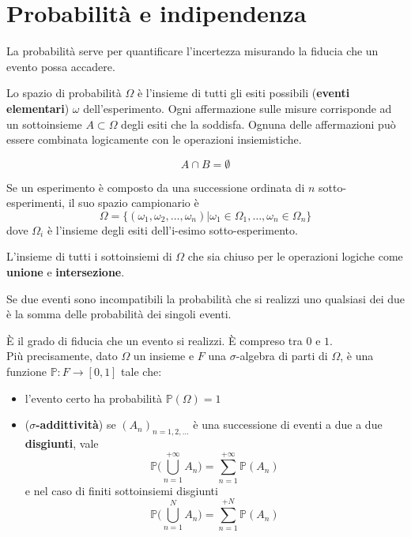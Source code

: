 \newpage
\section{Probabilità e indipendenza}
La probabilità serve per quantificare l'incertezza misurando la fiducia che un evento possa accadere.
\begin{definition}
	Lo spazio di probabilità $\Omega$ è l'insieme di tutti gli esiti possibili (\textbf{eventi elementari}) $\omega$ dell'esperimento. Ogni affermazione sulle misure corrisponde ad un sottoinsieme $A \subset \Omega$ degli esiti che la soddisfa. Ognuna delle affermazioni può essere combinata logicamente con le operazioni insiemistiche.
\end{definition}
\begin{definition}
	\begin{equation}
		A \cap B = \emptyset
	\end{equation}
\end{definition}
\begin{definition}
	Se un esperimento è composto da una successione ordinata di $n$ sotto-esperimenti, il suo spazio campionario è
	\begin{equation}
		\Omega = \{(\omega_1, \omega_2, \ldots, \omega_n) \vert \omega_1 \in \Omega_1, \ldots, \omega_n \in \Omega_n\}
	\end{equation}
	dove $\Omega_i$ è l'insieme degli esiti dell'i-esimo sotto-esperimento.
\end{definition}
\begin{definition}
	L'insieme di tutti i sottoinsiemi di $\Omega$ che sia chiuso per le operazioni logiche come \textbf{unione} e \textbf{intersezione}.
\end{definition}
\begin{observation}
	Se due eventi sono incompatibili la probabilità che si realizzi uno qualsiasi dei due è la somma delle probabilità dei singoli eventi.
\end{observation}
\begin{definition}[Probabilità]
	È il grado di fiducia che un evento si realizzi. È compreso tra $0$ e $1$.\\
	Più precisamente, dato $\Omega$ un insieme e $F$ una $\sigma$-algebra di parti di $\Omega$, è una funzione $\mathbb{P}:F\to [0,1]$ tale che:
	\begin{itemize}
		\item l'evento certo ha probabilità $\mathbb{P}(\Omega)=1$
		\item (\textbf{$\sigma$-addittività}) se $(A_n)_{n=1,2,\ldots}$ è una successione di eventi a due a due \textbf{disgiunti}, vale
		\begin{equation}
			\mathbb{P}\bigg(\bigcup_{n=1}^{+\infty}A_n\bigg) = \sum_{n=1}^{+\infty}\mathbb{P}(A_n)
		\end{equation}
		e nel caso di finiti sottoinsiemi disgiunti
		\begin{equation}
			\mathbb{P}\bigg(\bigcup_{n=1}^{N}A_n\bigg) = \sum_{n=1}^{+N}\mathbb{P}(A_n)
		\end{equation}
	\end{itemize}
\end{definition}

